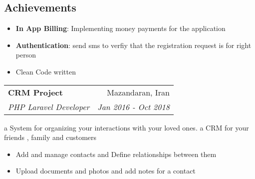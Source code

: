 \documentclass[A4,11pt]{article}
\makeatletter
\newcommand{\resumeItem}[2]{
  \item{
    \textbf{#1}{: #2 \vspace{-2pt}}
  }
}
\newcommand{\resumeProjectItem}[1]{
  \item{
    { #1 \vspace{-2pt}}
  }
}
\newcommand{\resumeSubheading}[4]{
  \vspace{-1pt}\item
    \begin{tabular*}{0.97\textwidth}[t]{l@{\extracolsep{\fill}}r}
      \textbf{#1} & #2 \\
      \textit{#3} & \textit{\small #4} \\
    \end{tabular*}\vspace{-5pt}
}
\newcommand{\resumeSubSubheading}[2]{
    \begin{tabular*}{0.97\textwidth}{l@{\extracolsep{\fill}}r}
      \textit{#1} & \textit{\small #2} \\
    \end{tabular*}\vspace{-5pt}
}
\newcommand{\resumeSubHeadingListEnd}{\end{itemize}}
\newcommand{\resumeItemListStart}{\begin{itemize}}
\newcommand{\resumeItemListEnd}{\end{itemize}\vspace{-5pt}}
\makeatother
\begin{document}
     \vspace{-10pt}

	\subsection*{Achievements}
	\vspace{-10pt}
	\resumeItemListStart
        \resumeItem{In App Billing}{ Implementing money payments for the application }
	\resumeItem{Authentication}{send sms to verfiy that the registration request is for right person}
     \resumeProjectItem{Clean Code written}
      \resumeItemListEnd
      
    
     \vspace{5pt}
 
    \resumeSubheading
      {CRM Project}{Mazandaran, Iran}
      {PHP Laravel Developer}{Jan 2016 - Oct 2018}
      
     \vspace{10pt}

	{a System for organizing your interactions with your loved ones. a CRM for your friends , family and customers  }

      
      \resumeItemListStart
        \resumeProjectItem
          {Add and manage contacts and Define relationships between them}
        \resumeProjectItem
          {Upload documents and photos and add notes for a contact}

      \resumeItemListEnd

       \vspace{-10pt}
      
\end{document}
